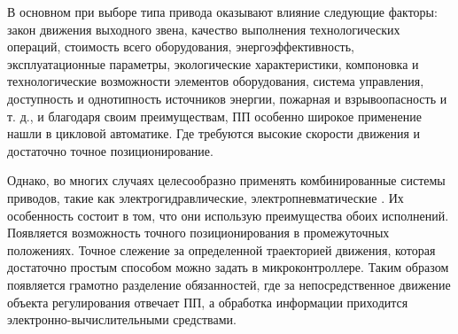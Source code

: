 В основном при выборе типа привода оказывают влияние следующие факторы: закон движения выходного звена, качество выполнения
технологических операций, стоимость всего оборудования, энергоэффективность, эксплуатационные параметры, экологические характеристики,
компоновка и технологические возможности элементов оборудования, система управления, доступность и однотипность источников
энергии, пожарная и взрывоопасность и т. д., и благодаря своим преимуществам, ПП особенно широкое применение нашли в цикловой автоматике.
Где требуются высокие скорости движения и достаточно точное позиционирование.


Однако,
во многих случаях целесообразно применять комбинированные системы приводов, такие как
электрогидравлические, электропневматические \cite{рабинович1973системы,трофимов:a}. Их особенность
состоит в том, что они использую преимущества обоих исполнений. Появляется возможность точного позиционирования в промежуточных
положениях. Точное слежение за определенной траекторией движения, которая достаточно простым способом можно
задать в микроконтроллере. Таким образом появляется грамотно разделение обязанностей, где за непосредственное движение объекта регулирования
отвечает ПП, а обработка информации приходится электронно-вычислительными средствами.

